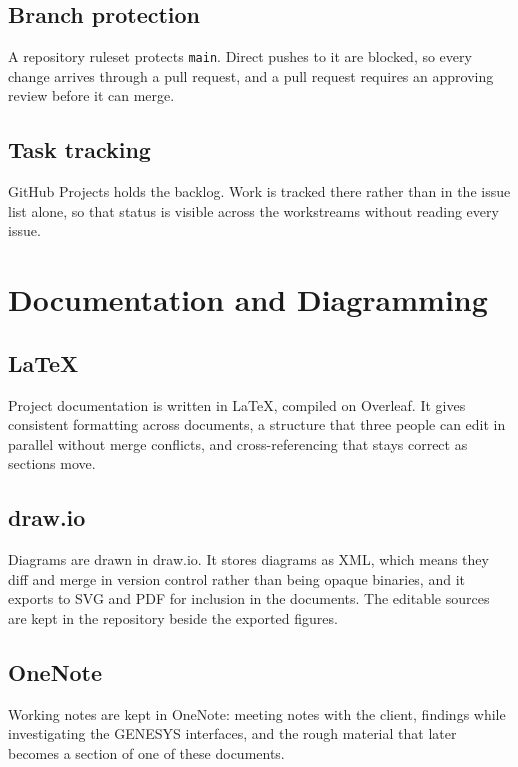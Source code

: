 \subsection{Branch protection}

A repository ruleset protects \texttt{main}. Direct pushes to it are blocked, so
every change arrives through a pull request, and a pull request requires an
approving review before it can merge.

\subsection{Task tracking}

GitHub Projects holds the backlog. Work is tracked there rather than in the issue
list alone, so that status is visible across the workstreams without
reading every issue.

\section{Documentation and Diagramming}

\subsection{\LaTeX}

Project documentation is written in \LaTeX, compiled on Overleaf. It gives
consistent formatting across documents, a structure that three people can edit in
parallel without merge conflicts, and cross-referencing that stays correct as
sections move.

\subsection{draw.io}

Diagrams are drawn in draw.io. It stores diagrams as XML, which means they diff
and merge in version control rather than being opaque binaries, and it exports to
SVG and PDF for inclusion in the documents. The editable sources are kept in the
repository beside the exported figures.

\subsection{OneNote}

Working notes are kept in OneNote: meeting notes with the client, findings while
investigating the GENESYS interfaces, and the rough material that later becomes a
section of one of these documents.

